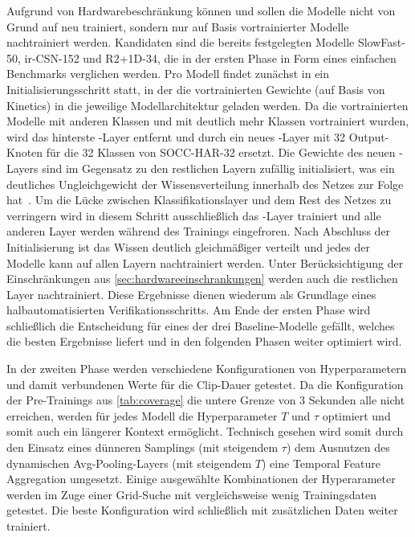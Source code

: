 Aufgrund von Hardwarebeschränkung können und sollen die Modelle nicht von Grund auf neu trainiert, sondern nur auf Basis vortrainierter Modelle nachtrainiert werden.
Kandidaten sind die bereits festgelegten Modelle SlowFast-50, ir-CSN-152 und R2+1D-34, die in der ersten Phase in Form eines einfachen Benchmarks verglichen werden.
Pro Modell findet zunächst in ein Initialisierungsschritt statt, in der die vortrainierten Gewichte (auf Basis von Kinetics) in die jeweilige Modellarchitektur geladen werden.
Da die vortrainierten Modelle mit anderen Klassen und mit deutlich mehr Klassen vortrainiert wurden, wird das hinterste \fc-Layer entfernt und durch ein neues \fc-Layer mit 32 Output-Knoten für die 32 Klassen von SOCC-HAR-32 ersetzt.
Die Gewichte des neuen \fc-Layers sind im Gegensatz zu den restlichen Layern zufällig initialisiert, was ein deutliches Ungleichgewicht der Wissensverteilung innerhalb des Netzes zur Folge hat~\cite{Gugger20}.
Um die Lücke zwischen Klassifikationslayer und dem Rest des Netzes zu verringern wird in diesem Schritt ausschließlich das \fc-Layer trainiert und alle anderen Layer werden während des Trainings eingefroren.
Nach Abschluss der Initialisierung ist das Wissen deutlich gleichmäßiger verteilt und jedes der Modelle kann auf allen Layern nachtrainiert werden.
Unter Berücksichtigung der Einschränkungen aus \autoref{sec:hardwareeinschrankungen} werden auch die restlichen Layer nachtrainiert.
Diese Ergebnisse dienen wiederum als Grundlage eines halbautomatisierten Verifikationsschritts.
Am Ende der ersten Phase wird schließlich die Entscheidung für eines der drei Baseline-Modelle gefällt, welches die besten Ergebnisse liefert und in den folgenden Phasen weiter optimiert wird.

In der zweiten Phase werden verschiedene Konfigurationen von Hyperparametern und damit verbundenen Werte für die Clip-Dauer getestet.
Da die Konfiguration der Pre-Trainings aus \autoref{tab:coverage} die untere Grenze von 3 Sekunden alle nicht erreichen, werden für jedes Modell die Hyperparameter $T$ und $\tau$ optimiert und somit auch ein längerer Kontext ermöglicht.
Technisch gesehen wird somit durch den Einsatz eines dünneren Samplings (mit steigendem $\tau$) \bzw dem Ausnutzen des dynamischen Avg-Pooling-Layers (mit steigendem $T$) eine Temporal Feature Aggregation umgesetzt.
Einige ausgewählte Kombinationen der Hyperarameter werden im Zuge einer Grid-Suche mit vergleichsweise wenig Trainingsdaten getestet.
Die beste Konfiguration wird schließlich mit zusätzlichen Daten weiter trainiert.


